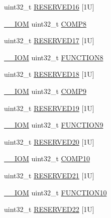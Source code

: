 \begin{DoxyCompactItemize}
\item 
uint32\+\_\+t \mbox{\hyperlink{struct_d_w_t___type_a1c18d707653399d2228813bdf7cf6ffb}{R\+E\+S\+E\+R\+V\+E\+D16}} \mbox{[}1\+U\mbox{]}
\item 
\mbox{\hyperlink{core__cm4_8h_ab6caba5853a60a17e8e04499b52bf691}{\+\_\+\+\_\+\+I\+OM}} uint32\+\_\+t \mbox{\hyperlink{struct_d_w_t___type_a9b9d9bb4b4ecab022a3d88d9cae6b5e0}{C\+O\+M\+P8}}
\item 
uint32\+\_\+t \mbox{\hyperlink{struct_d_w_t___type_aba61874f0eac372a611c3163ca61369c}{R\+E\+S\+E\+R\+V\+E\+D17}} \mbox{[}1\+U\mbox{]}
\item 
\mbox{\hyperlink{core__cm4_8h_ab6caba5853a60a17e8e04499b52bf691}{\+\_\+\+\_\+\+I\+OM}} uint32\+\_\+t \mbox{\hyperlink{struct_d_w_t___type_abe84d144b85c8dae18f7dc6d290a04ea}{F\+U\+N\+C\+T\+I\+O\+N8}}
\item 
uint32\+\_\+t \mbox{\hyperlink{struct_d_w_t___type_a21a175d13003bf8a59534104ad4699fb}{R\+E\+S\+E\+R\+V\+E\+D18}} \mbox{[}1\+U\mbox{]}
\item 
\mbox{\hyperlink{core__cm4_8h_ab6caba5853a60a17e8e04499b52bf691}{\+\_\+\+\_\+\+I\+OM}} uint32\+\_\+t \mbox{\hyperlink{struct_d_w_t___type_a4e090c0e6b818b63724c774f38ccab14}{C\+O\+M\+P9}}
\item 
uint32\+\_\+t \mbox{\hyperlink{struct_d_w_t___type_af476d7901cd2a48e4ecd52d471a9c07a}{R\+E\+S\+E\+R\+V\+E\+D19}} \mbox{[}1\+U\mbox{]}
\item 
\mbox{\hyperlink{core__cm4_8h_ab6caba5853a60a17e8e04499b52bf691}{\+\_\+\+\_\+\+I\+OM}} uint32\+\_\+t \mbox{\hyperlink{struct_d_w_t___type_a70ada7a7062083e68edb96698f25ba6e}{F\+U\+N\+C\+T\+I\+O\+N9}}
\item 
uint32\+\_\+t \mbox{\hyperlink{struct_d_w_t___type_af337378e1922d523d03560693d76ec67}{R\+E\+S\+E\+R\+V\+E\+D20}} \mbox{[}1\+U\mbox{]}
\item 
\mbox{\hyperlink{core__cm4_8h_ab6caba5853a60a17e8e04499b52bf691}{\+\_\+\+\_\+\+I\+OM}} uint32\+\_\+t \mbox{\hyperlink{struct_d_w_t___type_a8d5685c2bd0db66c3adaf19bc10a1150}{C\+O\+M\+P10}}
\item 
uint32\+\_\+t \mbox{\hyperlink{struct_d_w_t___type_a485451d515c8b75eefaf7e5f4dcc7c3a}{R\+E\+S\+E\+R\+V\+E\+D21}} \mbox{[}1\+U\mbox{]}
\item 
\mbox{\hyperlink{core__cm4_8h_ab6caba5853a60a17e8e04499b52bf691}{\+\_\+\+\_\+\+I\+OM}} uint32\+\_\+t \mbox{\hyperlink{struct_d_w_t___type_a87175ae057853babe4b55c2bf32ff933}{F\+U\+N\+C\+T\+I\+O\+N10}}
\item 
uint32\+\_\+t \mbox{\hyperlink{struct_d_w_t___type_aa681df6cc7c4648ad03416ceb3ad0002}{R\+E\+S\+E\+R\+V\+E\+D22}} \mbox{[}1\+U\mbox{]}

\end{DoxyCompactItemize}
